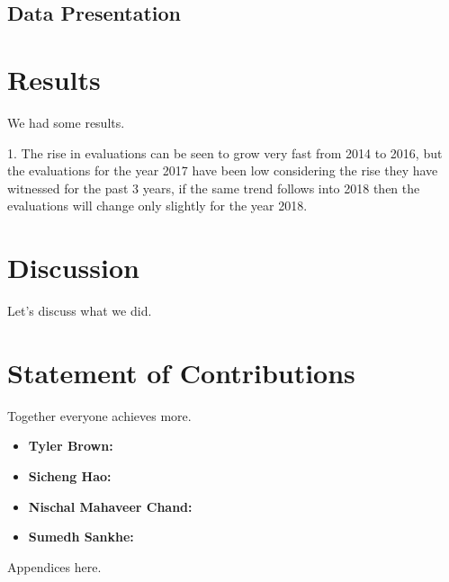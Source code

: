 \documentclass[12pt]{article}
\begin{document}
\subsection{Data Presentation}

\section*{Results}

We had some results.


1. The rise in evaluations can be seen to grow very fast from 2014 to 2016, but the 
evaluations for the year 2017 have been low considering the rise they have witnessed 
for the past 3 years, if the same trend follows into 2018 then the evaluations will change 
only slightly for the year 2018.

\section*{Discussion}

Let's discuss what we did.

\section*{Statement of Contributions}

Together everyone achieves more.

\begin{itemize}
\item \textbf{Tyler Brown:}
\item \textbf{Sicheng Hao:}
\item \textbf{Nischal Mahaveer Chand:}
\item \textbf{Sumedh Sankhe:}
\end{itemize}

 


\begin{appendices}

Appendices here.

\end{appendices}
\end{document}
